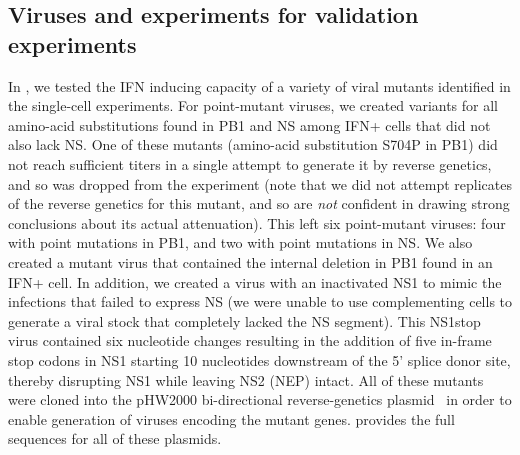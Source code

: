 \documentclass[9pt,lineno]{template}
\begin{document}
\subsection{Viruses and experiments for validation experiments}
In , we tested the IFN inducing capacity of a variety of viral mutants identified in the single-cell experiments.
For point-mutant viruses, we created variants for all amino-acid substitutions found in PB1 and NS among IFN+ cells that did not also lack NS.
One of these mutants (amino-acid substitution S704P in PB1) did not reach sufficient titers in a single attempt to generate it by reverse genetics, and so was dropped from the experiment (note that we did not attempt replicates of the reverse genetics for this mutant, and so are \emph{not} confident in drawing strong conclusions about its actual attenuation).
This left six point-mutant viruses: four with point mutations in PB1, and two with point mutations in NS.
We also created a mutant virus that contained the internal deletion in PB1 found in an IFN+ cell.
In addition, we created a virus with an inactivated NS1 to mimic the infections that failed to express NS (we were unable to use complementing cells to generate a viral stock that completely lacked the NS segment).
This NS1stop virus contained six nucleotide changes resulting in the addition of five in-frame stop codons in NS1 starting 10 nucleotides downstream of the 5' splice donor site, thereby disrupting NS1 while leaving NS2 (NEP) intact.
All of these mutants were cloned into the pHW2000 bi-directional reverse-genetics plasmid~\citep{hoffmann2000dna} in order to enable generation of viruses encoding the mutant genes.
  provides the full sequences for all of these plasmids.
\end{document}
